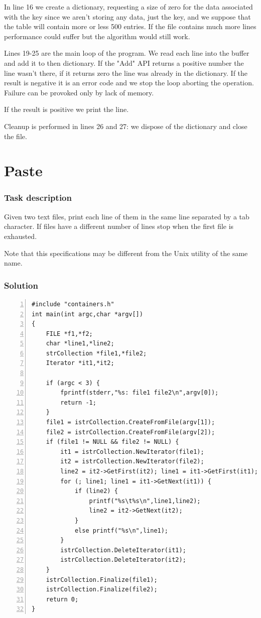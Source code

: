 \documentclass[12pt,a4paper]{memoir} %
\begin{document}
{{In line 16 we create a dictionary, requesting a size of zero for the
data associated with the key since we aren't storing any data, just the
key, and we suppose that the table will contain more or less 500
entries. If the file contains much more lines performance could
suffer but the algorithm would still work.

Lines 19-25 are the main loop of the program. We read each line into
the buffer and add it to then dictionary. If the "Add" API returns
a positive number the line wasn't there, if it returns zero the
line was already in the dictionary. If the result is negative it
is an error code and we stop the loop aborting the operation. Failure
can be provoked only by lack of memory.

If the result is positive we print the line.

Cleanup is performed in lines 26 and 27: we dispose of the dictionary
and close the file.

\section{Paste}
\subsubsection{Task description}
Given two text files, print each line of them in the same line separated by a tab character. If files have a different number of lines
stop when the first file is exhausted.

Note that this specifications may be different from the Unix utility of the same name.
\subsubsection{Solution}
\begin{Verbatim}[numbers=left]
#include "containers.h"
int main(int argc,char *argv[])
{
    FILE *f1,*f2;
    char *line1,*line2;
    strCollection *file1,*file2;
    Iterator *it1,*it2;
  
    if (argc < 3) {
        fprintf(stderr,"%s: file1 file2\n",argv[0]);
        return -1;
    }
    file1 = istrCollection.CreateFromFile(argv[1]);
    file2 = istrCollection.CreateFromFile(argv[2]);
    if (file1 != NULL && file2 != NULL) {
        it1 = istrCollection.NewIterator(file1);
        it2 = istrCollection.NewIterator(file2);
        line2 = it2->GetFirst(it2); line1 = it1->GetFirst(it1);
        for (; line1; line1 = it1->GetNext(it1)) {
            if (line2) {
                printf("%s\t%s\n",line1,line2);
                line2 = it2->GetNext(it2);
            }
            else printf("%s\n",line1);
        }
        istrCollection.DeleteIterator(it1);
        istrCollection.DeleteIterator(it2);
    }
    istrCollection.Finalize(file1);
    istrCollection.Finalize(file2);
    return 0;
}
\end{Verbatim}
}}
\end{document}
